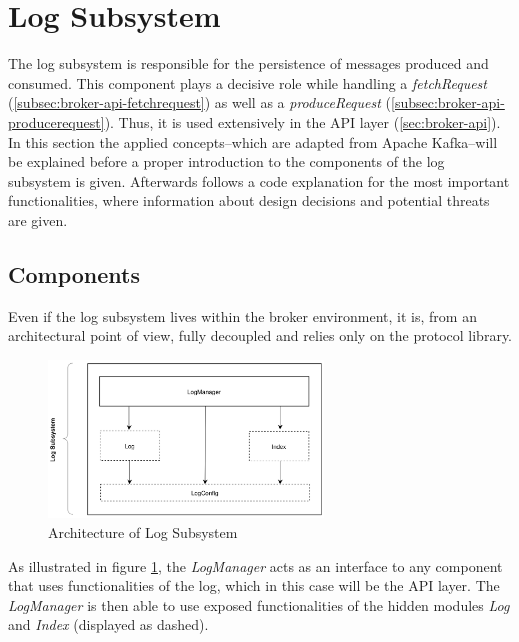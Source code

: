 \newpage
\section{Log Subsystem}
\label{sec:impl-broker-log}

The log subsystem is responsible for the persistence of messages 
produced and consumed. This component plays a decisive role while handling a
\textit{fetchRequest} (\ref{subsec:broker-api-fetchrequest}) as well as a
\textit{produceRequest} (\ref{subsec:broker-api-producerequest}). Thus, it is
used extensively in the API layer (\ref{sec:broker-api}). In this section
the applied concepts--which are adapted from Apache Kafka--will be explained
before a proper introduction to the components of the log subsystem is given.
Afterwards follows a code explanation for the most important functionalities, where
information about design decisions and potential threats are given.

\subsection{Components}

Even if the log subsystem lives within the broker environment, it is, from an
architectural point of view, fully decoupled and relies only on the protocol
library.

\begin{figure}[H]
    \centering
    \includegraphics[width=0.65\textwidth]{images/broker-log-overview.png}
    \caption{Architecture of Log Subsystem}
    \label{fig:broker-log-overview}
\end{figure}

As illustrated in figure \ref{fig:broker-log-overview}, the \textit{LogManager}
acts as an interface to any component that uses functionalities of the log, which
in this case will be the API layer. The \textit{LogManager} is then able to use
exposed functionalities of the hidden modules \textit{Log} and
\textit{Index} (displayed as dashed). 

